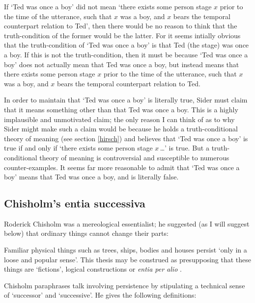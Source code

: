 \documentclass[11pt]{article}
\newenvironment{squote}{%
\begin{spacing}{1}
\begin{list}{}{%
\setlength{\labelwidth}{0pt}%
\rightmargin\leftmargin%
}
\item\relax
}{%
\end{list}%
\end{spacing}
}
\begin{document}
\begin{spacing}{1.5}
If `Ted was once a boy' did not mean `there exists some person stage
$x$ prior to the time of the utterance, such that $x$ was a boy, and
$x$ bears the temporal counterpart relation to Ted', then there would
be no reason to think that the truth-condition of the former would be
the latter.  For it seems intially obvious that the truth-condition of
`Ted was once a boy' is that Ted (the stage) was once a boy.  If this
is not the truth-condition, then it must be because `Ted was once a
boy' does not actually mean that Ted was once a boy, but instead means
that there exists some person stage $x$ prior to the time of the
utterance, such that $x$ was a boy, and $x$ bears the temporal
counterpart relation to Ted.

In order to maintain that `Ted was once a boy' is literally true,
Sider must claim that it means something other than that Ted was once
a boy.  This is a highly implausible and unmotivated claim; the only
reason I can think of as to why Sider might make such a claim would be
because he holds a truth-conditional theory of meaning (see section
\ref{hirsch}) and believes that `Ted was once a boy' is true if and
only if `there exists some person stage $x$\,\ldots ' is true.  But a
truth-conditional theory of meaning is controversial and susceptible
to numerous counter-examples.  It seems far more reasonable to admit
that `Ted was once a boy' means that Ted was once a boy, and is
literally false.

\subsection{Chisholm's entia successiva}
\label{chisholm}
Roderick Chisholm was a mereological essentialist; he suggested (as I
will suggest below) that ordinary things cannot change their parts:

\begin{squote}
Familiar physical things such as trees, ships, bodies and houses
persist `only in a loose and popular sense'.  This thesis may be
construed as presupposing that these things are `fictions', logical
constructions or {\em entia per alio} \citeyearpar[97]{chisholm1979}.
\end{squote}

Chisholm paraphrases talk involving persistence by stipulating a
technical sense of `successor' and `successive'.  He gives the
following definitions:


\end{spacing}
\end{document}
